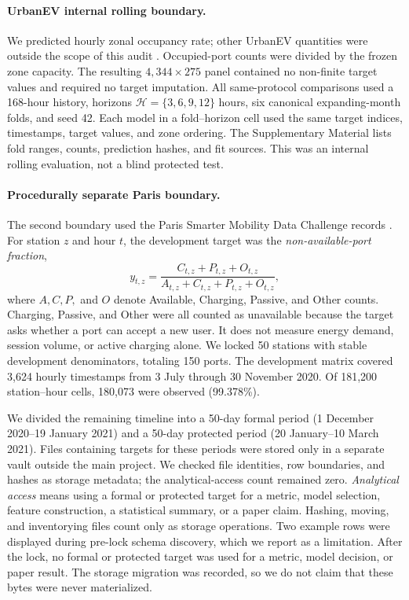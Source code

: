 \paragraph{UrbanEV internal rolling boundary.}
We predicted hourly zonal occupancy rate; other UrbanEV quantities were outside the scope of this audit \cite{li2025urbanev}.  Occupied-port counts were divided by the frozen zone capacity.  The resulting $4{,}344\times275$ panel contained no non-finite target values and required no target imputation.  All same-protocol comparisons used a 168-hour history, horizons $\mathcal{H}=\{3,6,9,12\}$ hours, six canonical expanding-month folds, and seed 42.  Each model in a fold--horizon cell used the same target indices, timestamps, target values, and zone ordering.  The Supplementary Material lists fold ranges, counts, prediction hashes, and fit sources.  This was an internal rolling evaluation, not a blind protected test.

\paragraph{Procedurally separate Paris boundary.}
The second boundary used the Paris Smarter Mobility Data Challenge records \cite{amaraouali2024smarter,amaraouali2023parisdataset}.  For station $z$ and hour $t$, the development target was the \emph{non-available-port fraction},
\begin{equation}
    y_{t,z}=\frac{C_{t,z}+P_{t,z}+O_{t,z}}
    {A_{t,z}+C_{t,z}+P_{t,z}+O_{t,z}},
    \label{eq:paris-target}
\end{equation}
where $A,C,P,$ and $O$ denote Available, Charging, Passive, and Other counts.  Charging, Passive, and Other were all counted as unavailable because the target asks whether a port can accept a new user.  It does not measure energy demand, session volume, or active charging alone.  We locked 50 stations with stable development denominators, totaling 150 ports.  The development matrix covered 3,624 hourly timestamps from 3 July through 30 November 2020.  Of 181,200 station--hour cells, 180,073 were observed (99.378\%).

We divided the remaining timeline into a 50-day formal period (1 December 2020--19 January 2021) and a 50-day protected period (20 January--10 March 2021).  Files containing targets for these periods were stored only in a separate vault outside the main project.  We checked file identities, row boundaries, and hashes as storage metadata; the analytical-access count remained zero.  \emph{Analytical access} means using a formal or protected target for a metric, model selection, feature construction, a statistical summary, or a paper claim.  Hashing, moving, and inventorying files count only as storage operations.  Two example rows were displayed during pre-lock schema discovery, which we report as a limitation.  After the lock, no formal or protected target was used for a metric, model decision, or paper result.  The storage migration was recorded, so we do not claim that these bytes were never materialized.

